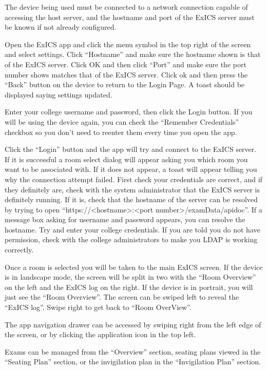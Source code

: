 The device being used must be connected to a network connection capable of accessing the host server, and the hostname and port of the ExICS server must be known if not already configured.

Open the ExICS app and click the menu symbol in the top right of the screen and select settings.  Click ``Hostname'' and make sure the hostname shown is that of the ExICS server.  Click OK and then click ``Port'' and make sure the port number shows matches that of the ExICS server.  Click ok and then press the ``Back'' button on the device to return to the Login Page.  A toast should be displayed saying settings updated.

Enter your college username and password, then click the Login button.  If you will be using the device again, you can check the ``Remember Credentials'' checkbox so you don't need to reenter them every time you open the app.

Click the ``Login'' button and the app will try and connect to the ExICS server.  If it is successful a room select dialog will appear asking you which room you want to be associated with.  If it does not appear, a toast will appear telling you why the connection attempt failed.  First check your credentials are correct, and if they definitely are, check with the system administrator that the ExICS server is definitely running.  If it is, check that the hostname of the server can be resolved by trying to open ``https://\textless hostname\textgreater :\textless port number\textgreater/examData/apidoc''.  If a message box asking for username and password appears, you can resolve the hostname.  Try and enter your college credentials.  If you are told you do not have permission, check with the college administrators to make you LDAP is working correctly.

Once a room is selected you will be taken to the main ExICS screen.  If the device is in landscape mode, the screen will be split in two with the ``Room Overview'' on the left and the ExICS log on the right.  If the device is in portrait, you will just see the ``Room Overview''.  The screen can be swiped left to reveal the ``ExICS log''.  Swipe right to get back to ``Room OverView''.

The app navigation drawer can be accessed by swiping right from the left edge of the screen, or by clicking the application icon in the top left.

Exams can be managed from the ``Overview'' section, seating plans viewed in the ``Seating Plan'' section, or the invigilation plan in the ``Invigilation Plan'' section.

